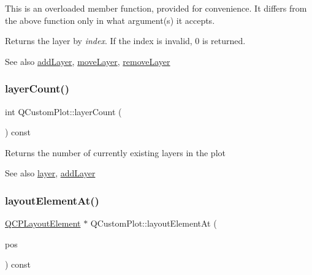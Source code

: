 This is an overloaded member function, provided for convenience. It differs from the above function only in what argument(s) it accepts.

Returns the layer by {\itshape index}. If the index is invalid, 0 is returned.

\begin{DoxySeeAlso}{See also}
\hyperlink{class_q_custom_plot_ad5255393df078448bb6ac83fa5db5f52}{add\+Layer}, \hyperlink{class_q_custom_plot_ae896140beff19424e9e9e02d6e331104}{move\+Layer}, \hyperlink{class_q_custom_plot_a40f75e342c5eaab6a86066a42a0e2a94}{remove\+Layer} 
\end{DoxySeeAlso}
\hypertarget{class_q_custom_plot_afa45d61e65292026f4c58c9c88c2cef0}{}\label{class_q_custom_plot_afa45d61e65292026f4c58c9c88c2cef0} 
\subsubsection{\texorpdfstring{layer\+Count()}{layerCount()}}
{\footnotesize\ttfamily int Q\+Custom\+Plot\+::layer\+Count (\begin{DoxyParamCaption}{ }\end{DoxyParamCaption}) const}

Returns the number of currently existing layers in the plot

\begin{DoxySeeAlso}{See also}
\hyperlink{class_q_custom_plot_a0a96244e7773b242ef23c32b7bdfb159}{layer}, \hyperlink{class_q_custom_plot_ad5255393df078448bb6ac83fa5db5f52}{add\+Layer} 
\end{DoxySeeAlso}
\hypertarget{class_q_custom_plot_afaa1d304e0287d140fd238e90889ef3c}{}\label{class_q_custom_plot_afaa1d304e0287d140fd238e90889ef3c} 
\subsubsection{\texorpdfstring{layout\+Element\+At()}{layoutElementAt()}}
{\footnotesize\ttfamily \hyperlink{class_q_c_p_layout_element}{Q\+C\+P\+Layout\+Element} $\ast$ Q\+Custom\+Plot\+::layout\+Element\+At (\begin{DoxyParamCaption}\item[{const Q\+PointF \&}]{pos }\end{DoxyParamCaption}) const}

